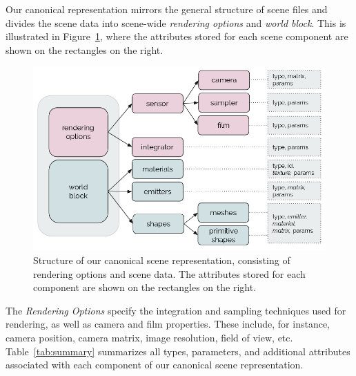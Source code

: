 

Our canonical representation mirrors the general structure of scene files and divides the scene data into
scene-wide {\it rendering options} and {\it world block}. 
This is illustrated in Figure~\ref{fig:canonicalrep}, where the attributes stored for each scene component are shown on the rectangles on the right.

\begin{figure}[h]
\centering
\includegraphics[width=0.9\linewidth]{figs/3_system_architecture/canonicalrep.png}
\caption{Structure of our canonical scene representation, consisting of rendering options and scene data. The attributes stored for each component are shown on the rectangles on the right.}
\label{fig:canonicalrep}
\end{figure}

The \textit{Rendering Options}
specify the integration and sampling techniques used for
rendering, as well as camera and film properties. These include, for instance, camera position, camera matrix, image resolution, field of view, etc.
Table~\ref{tab:summary} summarizes all types, parameters, and additional attributes associated with each component of our canonical scene representation. 

